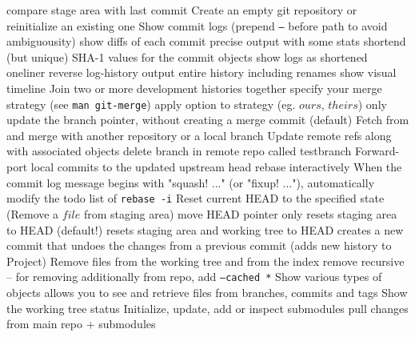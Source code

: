 	{compare stage area with last commit}
	{Create an empty git repository or reinitialize an existing one}
	{Show commit logs (prepend {\tt --} before path to avoid ambiguousity)}
	{show diffs of each commit}
	{precise output with some stats}
	{shortend (but unique) SHA-1 values for the commit objects }
	{show logs as shortened oneliner}
	{reverse log-history output}
	{entire history including renames}
	{show visual timeline}
	{Join two or more development histories together}
	{specify your merge strategy (see {\tt man git-merge})}
	{apply option to strategy (eg. $ours$, $theirs$)}
	{only update the branch pointer, without creating a merge commit (default)}
	{Fetch from and merge with another re\-pository or a local branch}
	{Update remote refs along with associated objects}
	{delete branch in remote repo called testbranch}
	{Forward-port local commits to the updated upstream head}
	{rebase interactively}
	{When the commit log message begins with "squash! ..." (or "fixup! ..."), automatically modify the todo list of {\tt rebase -i} }
	{Reset current HEAD to the specified state (Remove a $file$ from staging area)}
	{move HEAD pointer only}
	{resets staging area to HEAD (default!)}
	{resets staging area and working tree to HEAD}
	{creates a new commit that undoes the changes from a previous commit (adds new history to Project)}
	{Remove files from the working tree and from the index}
	{remove recursive -- for removing additionally from repo, add
{\tt --cached *}}
	{Show various types of objects}
	{allows you to see and retrieve files from bran\-ches, commits and tags}
	{Show the working tree status}
	{Initialize, update, add or inspect submodules}
	{pull changes from main repo + submodules}

